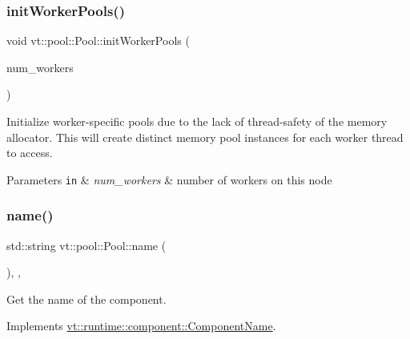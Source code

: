 \subsubsection{\texorpdfstring{init\+Worker\+Pools()}{initWorkerPools()}}
{\footnotesize\ttfamily void vt\+::pool\+::\+Pool\+::init\+Worker\+Pools (\begin{DoxyParamCaption}\item[{\hyperlink{namespacevt_aa93398ea48f2cb6c188512250f7cc248}{Worker\+Count\+Type} const \&}]{num\+\_\+workers }\end{DoxyParamCaption})}



Initialize worker-\/specific pools due to the lack of thread-\/safety of the memory allocator. This will create distinct memory pool instances for each worker thread to access. 


\begin{DoxyParams}[1]{Parameters}
\mbox{\tt in}  & {\em num\+\_\+workers} & number of workers on this node \\
\hline
\end{DoxyParams}
\mbox{\label{structvt_1_1pool_1_1_pool_a02fa54fc3cca0d388f25f397dfd997ab}} 
\subsubsection{\texorpdfstring{name()}{name()}}
{\footnotesize\ttfamily std\+::string vt\+::pool\+::\+Pool\+::name (\begin{DoxyParamCaption}{ }\end{DoxyParamCaption})\hspace{0.3cm}{\ttfamily [inline]}, {\ttfamily [override]}, {\ttfamily [virtual]}}



Get the name of the component. 



Implements \hyperlink{structvt_1_1runtime_1_1component_1_1_component_name_a33c06229bb605a2b2ceff68830d6d773}{vt\+::runtime\+::component\+::\+Component\+Name}.

\mbox{\label{structvt_1_1pool_1_1_pool_aa9ae08727c21035461d6f60b93ea19ab}} 
